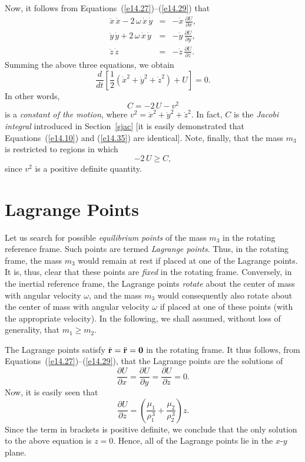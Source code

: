 Now, it follows from Equations~(\ref{e14.27})--(\ref{e14.29}) that
\begin{eqnarray}
\ddot{x}\,\dot{x} - 2\,\omega\,\dot{x}\,\dot{y} &=& -\dot{x}\,\frac{\partial U}{\partial x},\\[0.5ex]
\ddot{y}\,\dot{y} + 2\,\omega\,\dot{x}\,\dot{y} &=& -\dot{y}\,\frac{\partial U}{\partial y},\\[0.5ex]
\ddot{z}\,\dot{z}  &=& -\dot{z}\,\frac{\partial U}{\partial z}.
\end{eqnarray}
Summing the above three equations, we obtain
\begin{equation}
\frac{d}{dt}\left[\frac{1}{2}\left(\dot{x}^2+\dot{y}^2+\dot{z}^2\right) + U\right] = 0.
\end{equation}
In other words,
\begin{equation}\label{e14.35}
C = - 2\,U - v^2
\end{equation}
is a {\em constant of the motion}, where $v^2=\dot{x}^2+\dot{y}^2+\dot{z}^2$. In fact, $C$ is the
{\em Jacobi integral}\/ introduced in Section~\ref{sjac} [it is easily demonstrated that Equations~(\ref{e14.10}) and
(\ref{e14.35}) are identical].
 Note, finally, that
the mass $m_3$ is restricted to regions in which
\begin{equation}
-2\,U \geq C,
\end{equation} 
since $v^2$ is a positive definite quantity.

\section{Lagrange Points}
Let us search for possible {\em equilibrium  points}\/ of the mass $m_3$ in the rotating reference frame. Such points
are termed  {\em Lagrange points}. Thus, in the rotating  frame, the mass $m_3$   would remain at rest if placed at one of the Lagrange points. It is, thus, clear that these points are
{\em fixed}\/ in the rotating frame.
Conversely, in the inertial reference frame, the Lagrange points {\em rotate}\/ about the center of mass with
angular velocity $\omega$, and the mass $m_3$  would consequently also rotate about the center
of mass with angular velocity $\omega$ if placed at one of these points (with the appropriate
velocity). In the following,
we shall assumed, without loss of generality, that $m_1\geq m_2$.

The Lagrange points satisfy $\dot{\bf r} =\ddot{\bf r} = {\bf 0}$ in the rotating frame.
It thus follows, from Equations~(\ref{e14.27})--(\ref{e14.29}), that the Lagrange
points are the solutions of
\begin{equation}
\frac{\partial U}{\partial x} = \frac{\partial U}{\partial y}= \frac{\partial U}{\partial z}=0.
\end{equation}
Now, it is easily seen that
\begin{equation}
\frac{\partial U}{\partial z} = \left(\frac{\mu_1}{\rho_1^{\,3}}+ \frac{\mu_2}{\rho_2^{\,3}}\right) z.
\end{equation}
Since the term in brackets is positive definite, we conclude that the only solution to the
above equation is $z=0$. Hence, all of the Lagrange points lie in the $x$-$y$ plane.

